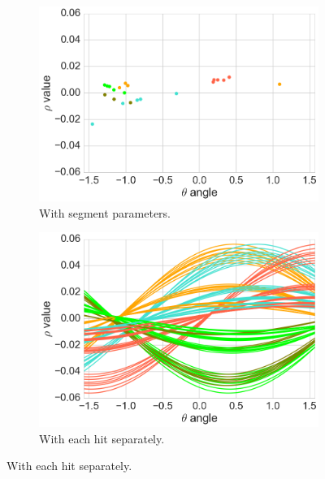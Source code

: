 \begin{figure}
  \centering
  \begin{subfigure}[t]{0.48\linewidth}
    \includegraphics[width=\linewidth]{figures/workflow/quad_tree_segments.png}
    \caption{With segment parameters.}
    \label{fig-quad-tree-segments}
  \end{subfigure}
  \begin{subfigure}[t]{0.48\linewidth}
    \centering
    \includegraphics[width=\linewidth]{figures/workflow/quad_tree_normal_hits.png}
    \caption{With each hit separately.}
    \label{fig-quad-tree-normal-hits}
  \end{subfigure}
  

\end{figure}
